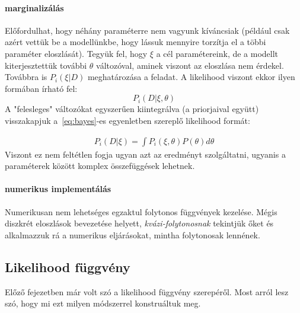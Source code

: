 \paragraph{marginalizálás}
Előfordulhat, hogy néhány paraméterre nem vagyunk kíváncsiak (például csak azért vettük be a modellünkbe, hogy lássuk mennyire torzítja el a többi paraméter eloszlását). Tegyük fel, hogy $\xi$ a cél paramétereink, de a modellt kiterjesztettük további $\theta$ változóval, aminek viszont az eloszlása nem érdekel. Továbbra is $P_i(\xi|D)$ meghatározása a feladat.  A likelihood viszont ekkor ilyen formában írható fel:
\[
P_i(D|\xi, \theta)
\]
A "felesleges" változókat egyszerűen kiintegrálva (a priorjaival együtt) visszakapjuk a~\ref{eq:bayes}-es egyenletben szereplő likelihood formát:

\begin{eqnarray}\label{eq:marginalize}
P_i(D|\xi) = \int P_i(\xi, \theta)P(\theta)d\theta
\end{eqnarray}
Viszont ez nem feltétlen fogja ugyan azt az eredményt szolgáltatni, ugyanis a paraméterek között komplex összefüggések lehetnek.

\paragraph{numerikus implementálás}
Numerikusan nem lehetséges egzaktul folytonos függvények kezelése. Mégis diszkrét eloszlások bevezetése helyett, \textit{kvázi-folytonosnak} tekintjük őket és alkalmazzuk rá a numerikus eljárásokat, mintha folytonosak lennének.





\subsection{Likelihood függvény}\label{sec:likelihood}
Előző fejezetben már volt szó a likelihood függvény szerepéről. Most arról lesz szó, hogy mi ezt milyen módszerrel konstruáltuk meg.

